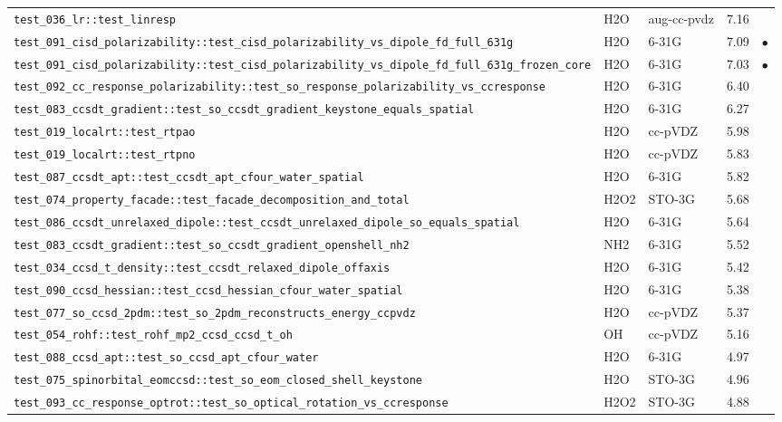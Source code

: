 \documentclass[10pt]{article}
\begin{document}
\begin{longtable}{l l l r c}
\texttt{test\_036\_lr::test\_linresp} & H2O & aug-cc-pvdz & 7.16 &  \\
\texttt{test\_091\_cisd\_polarizability::test\_cisd\_polarizability\_vs\_dipole\_fd\_full\_631g} & H2O & 6-31G & 7.09 & $\bullet$ \\
\texttt{test\_091\_cisd\_polarizability::test\_cisd\_polarizability\_vs\_dipole\_fd\_full\_631g\_frozen\_core} & H2O & 6-31G & 7.03 & $\bullet$ \\
\texttt{test\_092\_cc\_response\_polarizability::test\_so\_response\_polarizability\_vs\_ccresponse} & H2O & 6-31G & 6.40 &  \\
\texttt{test\_083\_ccsdt\_gradient::test\_so\_ccsdt\_gradient\_keystone\_equals\_spatial} & H2O & 6-31G & 6.27 &  \\
\texttt{test\_019\_localrt::test\_rtpao} & H2O & cc-pVDZ & 5.98 &  \\
\texttt{test\_019\_localrt::test\_rtpno} & H2O & cc-pVDZ & 5.83 &  \\
\texttt{test\_087\_ccsdt\_apt::test\_ccsdt\_apt\_cfour\_water\_spatial} & H2O & 6-31G & 5.82 &  \\
\texttt{test\_074\_property\_facade::test\_facade\_decomposition\_and\_total} & H2O2 & STO-3G & 5.68 &  \\
\texttt{test\_086\_ccsdt\_unrelaxed\_dipole::test\_ccsdt\_unrelaxed\_dipole\_so\_equals\_spatial} & H2O & 6-31G & 5.64 &  \\
\texttt{test\_083\_ccsdt\_gradient::test\_so\_ccsdt\_gradient\_openshell\_nh2} & NH2 & 6-31G & 5.52 &  \\
\texttt{test\_034\_ccsd\_t\_density::test\_ccsdt\_relaxed\_dipole\_offaxis} & H2O & 6-31G & 5.42 &  \\
\texttt{test\_090\_ccsd\_hessian::test\_ccsd\_hessian\_cfour\_water\_spatial} & H2O & 6-31G & 5.38 &  \\
\texttt{test\_077\_so\_ccsd\_2pdm::test\_so\_2pdm\_reconstructs\_energy\_ccpvdz} & H2O & cc-pVDZ & 5.37 &  \\
\texttt{test\_054\_rohf::test\_rohf\_mp2\_ccsd\_ccsd\_t\_oh} & OH & cc-pVDZ & 5.16 &  \\
\texttt{test\_088\_ccsd\_apt::test\_so\_ccsd\_apt\_cfour\_water} & H2O & 6-31G & 4.97 &  \\
\texttt{test\_075\_spinorbital\_eomccsd::test\_so\_eom\_closed\_shell\_keystone} & H2O & STO-3G & 4.96 &  \\
\texttt{test\_093\_cc\_response\_optrot::test\_so\_optical\_rotation\_vs\_ccresponse} & H2O2 & STO-3G & 4.88 &  \\

\end{longtable}
\end{document}
